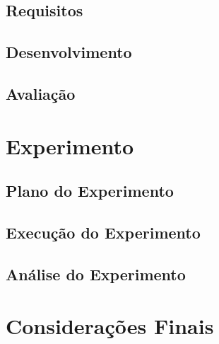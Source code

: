\subsection{Requisitos}
\subsection{Desenvolvimento}
\subsection{Avaliação}

\section{Experimento}

\subsection{Plano do Experimento}
\subsection{Execução do Experimento}
\subsection{Análise do Experimento}

\section{Considerações Finais}


